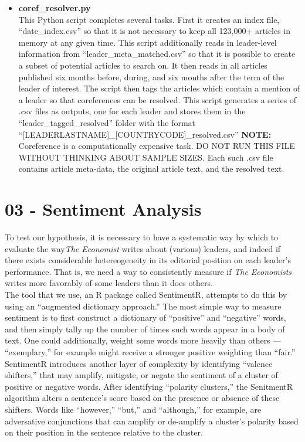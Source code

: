 \documentclass[11pt, letterpaper, twoside]{article}
\begin{document}
\begin{itemize}
    \item \textbf{coref\_resolver.py}\\
    This Python script completes several tasks. First it creates an index file, ``date\_index.csv'' so that it is not necessary to keep all 123,000+ articles in memory at any given time. This script additionally reads in leader-level information from ``leader\_meta\_matched.csv'' so that it is possible to create a subset of potential articles to search on. It then reads in all articles published six months before, during, and six months after the term of the leader of interest. The script then tags the articles which contain a mention of a leader so that coreferences can be resolved. This script generates a series of .csv files as outputs, one for each leader and stores them in the ``leader\_tagged\_resolved'' folder with the format ``[LEADERLASTNAME]\_[COUNTRYCODE]\_resolved.csv'' \textbf{NOTE:} Coreference is a computationally expensive task. DO NOT RUN THIS FILE WITHOUT THINKING ABOUT SAMPLE SIZES. Each such .csv file contains article meta-data, the original article text, and the resolved text.\\
\end{itemize}


\section{03 - Sentiment Analysis}
To test our hypothesis, it is necessary to have a systematic way by which to evaluate the way\textit{The Economist} writes about (various) leaders, and indeed if there exists considerable hetereogeneity in its editorial position on each leader's performance. That is, we need a way to consistently measure if \textit{The Economists} writes more favorably of some leaders than it does others.\\

The tool that we use, an R package called SentimentR, attempts to do this by using an ``augmented dictionary approach.'' \cite{rinker2019sentimentr} The most simple way to measure sentiment is to first construct a dictionary of ``positive'' and ``negative'' words, and then simply tally up the number of times such words appear in a body of text. One could additionally, weight some words more heavily than others --- ``exemplary,'' for example might receive a stronger positive weighting than ``fair.''\\

SentimentR introduces another layer of complexity by identifying ``valence shifters,'' that may amplify, mitigate, or negate the sentiment of a cluster of positive or negative words. After identifying ``polarity clusters,'' the SenitmentR algorithm alters a sentence's score based on the presence or absence of these shifters. Words like ``however,'' ``but,'' and ``although,'' for example, are adversative conjunctions that can amplify or de-amplify a cluster's polarity based on their position in the sentence relative to the cluster.\\
\end{document}
